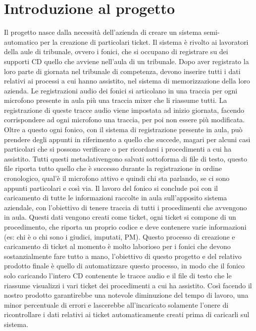 \section{Introduzione al progetto}
Il progetto nasce dalla necessità dell'azienda di creare un sistema semi-automatico per la creazione di particolari ticket. Il sistema è rivolto ai lavoratori della aule di tribunale,
ovvero i fonici, che si occupano di registrare su dei supporti CD quello che avviene nell'aula di un tribunale. Dopo aver registrato la loro parte di giornata nel tribunale di competenza,
devono inserire tutti i dati relativi ai processi a cui hanno assistito, nel sistema di memorizzazione della loro azienda. Le registrazioni audio dei fonici si articolano in una traccia per ogni microfono presente in aula
più una traccia mixer che li riassume tutti. La registrazione di queste tracce audio viene impostata ad inizio giornata, facendo corrispondere ad ogni microfono una traccia, per poi non essere più modificata.
Oltre a questo ogni fonico, con il sistema di registrazione presente in aula, può prendere degli appunti in riferimento a quello che succede, magari per alcuni casi particolari che si possono verificare o per ricordarsi i procedimenti a cui ha assistito.
Tutti questi \gls{metadati}\glsfirstoccur vengono salvati sottoforma di file di testo, questo file riporta tutto quello che è successo durante la registrazione in ordine cronologico, qual'è il microfono attivo e quindi chi sta parlando, se ci sono appunti particolari e così via.
Il lavoro del fonico si conclude poi con il caricamento di tutte le informazioni raccolte in aula sull'apposito sistema aziendale, con l'obiettivo di tenere traccia di tutti i procedimenti che avvengono in aula.
Questi dati vengono creati come ticket, ogni ticket si compone di un procedimento, che riporta un proprio codice e deve contenere varie informazioni (es: chi è o chi sono i giudici, imputati, PM).
Questo processo di creazione e caricamento di ticket al momento è molto laborioso per i fonici che devono sostanzialmente fare tutto a mano, l'obiettivo di questo progetto e del relativo prodotto finale è quello di
automatizzare questo processo, in modo che il fonico solo caricando l'intero CD contenente le tracce audio e il file di testo che le riassume visualizzi i vari ticket dei procedimenti a cui ha assistito. Così facendo il nostro prodotto
garantirebbe una notevole diminuzione del tempo di lavoro, una minor percentuale di errori e lascerebbe all'incaricato solamente l'onere di ricontrollare i dati relativi ai ticket automaticamente creati prima di caricarli sul sistema.

